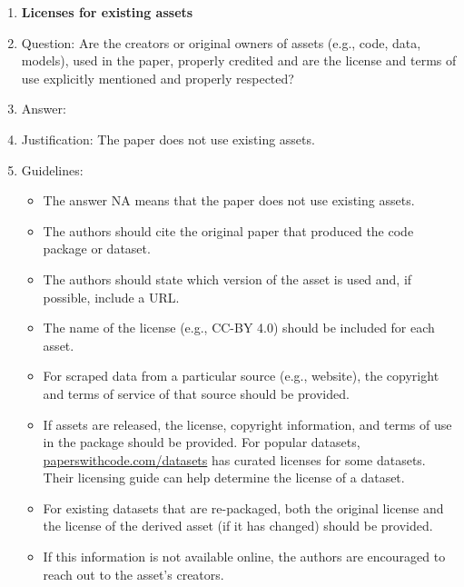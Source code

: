 \documentclass{article}
\begin{document}
\begin{enumerate}
\item {\bf Licenses for existing assets}
    \item[] Question: Are the creators or original owners of assets (e.g., code, data, models), used in the paper, properly credited and are the license and terms of use explicitly mentioned and properly respected?
    \item[] Answer: \answerNA{} %
    \item[] Justification: The paper does not use existing assets.
    \item[] Guidelines:
    \begin{itemize}
        \item The answer NA means that the paper does not use existing assets.
        \item The authors should cite the original paper that produced the code package or dataset.
        \item The authors should state which version of the asset is used and, if possible, include a URL.
        \item The name of the license (e.g., CC-BY 4.0) should be included for each asset.
        \item For scraped data from a particular source (e.g., website), the copyright and terms of service of that source should be provided.
        \item If assets are released, the license, copyright information, and terms of use in the package should be provided. For popular datasets, \url{paperswithcode.com/datasets} has curated licenses for some datasets. Their licensing guide can help determine the license of a dataset.
        \item For existing datasets that are re-packaged, both the original license and the license of the derived asset (if it has changed) should be provided.
        \item If this information is not available online, the authors are encouraged to reach out to the asset's creators.
    \end{itemize}


\end{enumerate}
\end{document}

